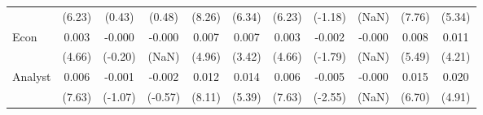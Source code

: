 \begin{table}[H]
{\begin{tabular}{lcccccccccc}
   & (6.23) & (0.43) & (0.48) & (8.26) & (6.34) & (6.23) & (-1.18) & (NaN) & (7.76) & (5.34) \\ 
  Econ & 0.003 & -0.000 & -0.000 & 0.007 & 0.007 & 0.003 & -0.002 & -0.000 & 0.008 & 0.011 \\ 
   & (4.66) & (-0.20) & (NaN) & (4.96) & (3.42) & (4.66) & (-1.79) & (NaN) & (5.49) & (4.21) \\ 
  Analyst & 0.006 & -0.001 & -0.002 & 0.012 & 0.014 & 0.006 & -0.005 & -0.000 & 0.015 & 0.020 \\ 
   & (7.63) & (-1.07) & (-0.57) & (8.11) & (5.39) & (7.63) & (-2.55) & (NaN) & (6.70) & (4.91) \\ 
   \hline 
\end{tabular}
}
\end{table}
